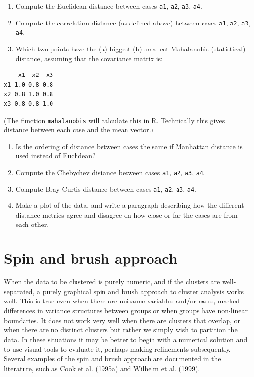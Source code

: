 \documentclass[
  letterpaper,
]{book}
\begin{document}
\begin{enumerate}
\def\labelenumi{\arabic{enumi}.}
\item
  Compute the Euclidean distance between cases \texttt{a1}, \texttt{a2},
  \texttt{a3}, \texttt{a4}.
\item
  Compute the correlation distance (as defined above) between cases
  \texttt{a1}, \texttt{a2}, \texttt{a3}, \texttt{a4}.
\item
  Which two points have the (a) biggest (b) smallest Mahalanobis
  (statistical) distance, assuming that the covariance matrix is:
\end{enumerate}

\begin{verbatim}
    x1  x2  x3
x1 1.0 0.8 0.8
x2 0.8 1.0 0.8
x3 0.8 0.8 1.0
\end{verbatim}

(The function \texttt{mahalanobis} will calculate this in R. Technically
this gives distance between each case and the mean vector.)

\begin{enumerate}
\def\labelenumi{\arabic{enumi}.}
\setcounter{enumi}{3}
\item
  Is the ordering of distance between cases the same if Manhattan
  distance is used instead of Euclidean?
\item
  Compute the Chebychev distance between cases \texttt{a1}, \texttt{a2},
  \texttt{a3}, \texttt{a4}.
\item
  Compute Bray-Curtis distance between cases \texttt{a1}, \texttt{a2},
  \texttt{a3}, \texttt{a4}.
\item
  Make a plot of the data, and write a paragraph describing how the
  different distance metrics agree and disagree on how close or far the
  cases are from each other.
\end{enumerate}

\hypertarget{sec-clust-graphics}{%
\chapter{Spin and brush approach}\label{sec-clust-graphics}}

 

When the data to be clustered is purely numeric, and if the clusters are
well-separated, a purely graphical spin and brush approach to cluster
analysis works well. This is true even when there are nuisance variables
and/or cases, marked differences in variance structures between groups
or when groups have non-linear boundaries. It does not work very well
when there are clusters that overlap, or when there are no distinct
clusters but rather we simply wish to partition the data. In these
situations it may be better to begin with a numerical solution and to
use visual tools to evaluate it, perhaps making refinements
subsequently. Several examples of the spin and brush approach are
documented in the literature, such as Cook et al. (1995a) and Wilhelm et
al. (1999).
\end{document}
